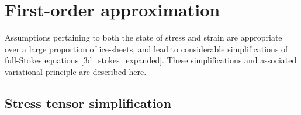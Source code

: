 \section{First-order approximation} \label{ssn_first_order}

Assumptions pertaining to both the state of stress and strain are appropriate over a large proportion of ice-sheets, and lead to considerable simplifications of full-Stokes equations \cref{3d_stokes_expanded}.  These simplifications and associated variational principle are described here.

\subsection{Stress tensor simplification}

